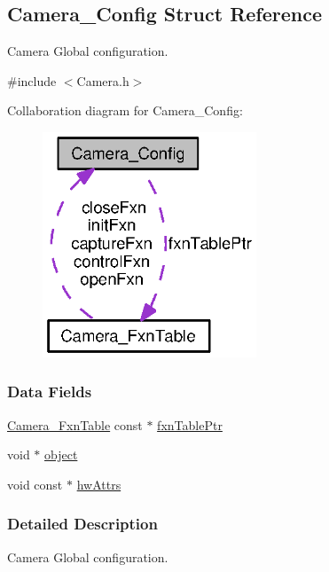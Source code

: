 \subsection{Camera\+\_\+\+Config Struct Reference}
\label{struct_camera___config}


Camera Global configuration.  




{\ttfamily \#include $<$Camera.\+h$>$}



Collaboration diagram for Camera\+\_\+\+Config\+:
\nopagebreak
\begin{figure}[H]
\begin{center}
\leavevmode
\includegraphics[width=181pt]{struct_camera___config__coll__graph}
\end{center}
\end{figure}
\subsubsection*{Data Fields}
\begin{DoxyCompactItemize}
\item 
\hyperlink{struct_camera___fxn_table}{Camera\+\_\+\+Fxn\+Table} const $\ast$ \hyperlink{struct_camera___config_a84046ad770e27d51563877f874ab7e13}{fxn\+Table\+Ptr}
\item 
void $\ast$ \hyperlink{struct_camera___config_a68276cf9733b156cd7eb22a2634388a6}{object}
\item 
void const $\ast$ \hyperlink{struct_camera___config_a8b228c55707f9f0735c1fc525a66b351}{hw\+Attrs}
\end{DoxyCompactItemize}


\subsubsection{Detailed Description}
Camera Global configuration. 

